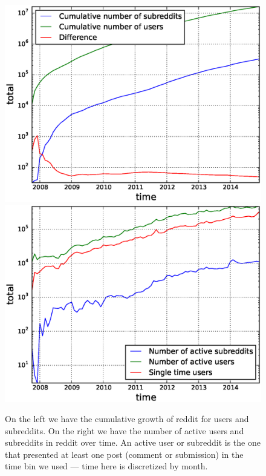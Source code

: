 \begin{figure}[!tb]
\centering
\includegraphics[scale=0.4]{./images/cumulative_users_subreddits.eps}
\includegraphics[scale=0.4]{./images/active_users_subreddits.eps}
\caption{On the left we have the cumulative growth of reddit for users and subreddits. On the right we have the number of active users and subreddits in reddit over time. An active user or subreddit is the one that presented at least one post (comment or submission) in the time bin we used --- time here is discretized by month.}
\label{fig:cumulative}
\end{figure}

